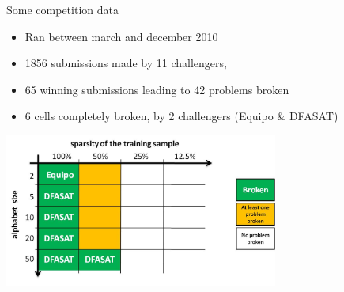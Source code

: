 \begin{frame}{Some competition data}
  \begin{itemize}
    \item Ran between march and december 2010
    \item 1856 submissions made by 11 challengers, 
    \item 65 winning submissions leading to 42 problems broken
    \item 6 cells completely broken, by 2 challengers (Equipo \& DFASAT)
  \end{itemize}

  \begin{center}
    \includegraphics[width=9cm]{images/stamina_broken.jpg}
  \end{center}

\end{frame}